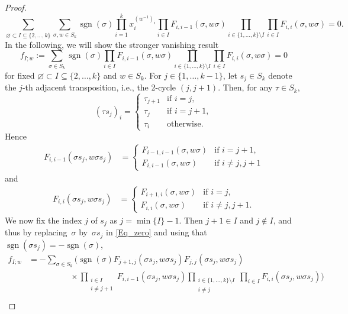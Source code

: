 \documentclass[10pt,a4paper]{amsart}
\DeclareMathOperator{\sgn}{sgn}
\begin{document}
\begin{proof}
\[
\sum_{\varnothing\subset I\subseteq\{2,\dots,k\}}
\sum_{\sigma,w\in S_k}\sgn(\sigma)
\prod_{i=1}^k x_i^{(w^{-1})_i}
\prod_{i\in I} F_{i,i-1}(\sigma,w\sigma)
\prod_{i\in\{1,\dots,k\}\setminus I}
\prod_{i\in I} F_{i,i}(\sigma,w\sigma)=0.
\]
In the following, we will show the stronger vanishing result
\begin{equation}\label{Eq_zero}
f_{I;w}:=\sum_{\sigma\in S_k}\sgn(\sigma)
\prod_{i\in I} F_{i,i-1}(\sigma,w\sigma)
\prod_{i\in\{1,\dots,k\}\setminus I}
\prod_{i\in I} F_{i,i}(\sigma,w\sigma)=0
\end{equation}
for fixed $\varnothing\subset I\subseteq\{2,\dots,k\}$ and $w\in S_k$.
For $j\in\{1,\dots,k-1\}$, let $s_j\in S_k$ denote the $j$-th adjacent
transposition, i.e., the 2-cycle $(j,j+1)$.
Then, for any $\tau\in S_k$,
\[
(\tau s_j)_i=\begin{cases}
\tau_{j+1} & \text{if $i=j$}, \\
\tau_j & \text{if $i=j+1$}, \\
\tau_i & \text{otherwise}.
\end{cases}
\]
Hence
\begin{align*}
F_{i,i-1}(\sigma s_j,w\sigma s_j)&=\begin{cases}
F_{i-1,i-1}(\sigma,w\sigma) & \text{if $i=j+1$}, \\
F_{i,i-1}(\sigma,w\sigma) & \text{if $i\neq j,j+1$}
\end{cases}
\end{align*}
and
\begin{align*}
F_{i,i}(\sigma s_j,w\sigma s_j)&=\begin{cases}
F_{i+1,i}(\sigma,w\sigma) & \text{if $i=j$}, \\
F_{i,i}(\sigma,w\sigma) & \text{if $i\neq j,j+1$}.
\end{cases}
\end{align*}
We now fix the index $j$ of $s_j$ as $j=\min\{I\}-1$.
Then $j+1\in I$ and $j\notin I$, and thus by replacing~$\sigma$
by~$\sigma s_j$ in \eqref{Eq_zero} and using that
$\sgn(\sigma s_j)=-\sgn(\sigma)$,
\begin{align*}
f_{I;w}&=-
\sum_{\sigma\in S_k}\biggl(\sgn(\sigma)
F_{j+1,j}(\sigma s_j,w\sigma s_j) F_{j,j}(\sigma s_j,w\sigma s_j) \\
& \qquad\qquad\quad\times
\prod_{\substack{i\in I\\[1pt] i\neq j+1}} F_{i,i-1}(\sigma s_j,w\sigma s_j)
\prod_{\substack{i\in\{1,\dots,k\}\setminus I \\[1pt] i\neq j}}
\prod_{i\in I} F_{i,i}(\sigma s_j,w\sigma s_j)\biggr) \\

\end{align*}
\end{proof}
\end{document}
